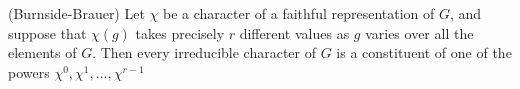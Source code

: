\begin{theorem}\label{thm:Burnside_Brauer}(Burnside-Brauer)
    Let $\chi$ be a character of a faithful representation of $G$, and suppose that $\chi(g)$ takes precisely $r$ 
    different values as $g$ varies over all the elements of $G$. Then every irreducible character of $G$ is a 
    constituent of one of the powers $\chi^0, \chi^1, ... , \chi^{r-1}$
\end{theorem}

